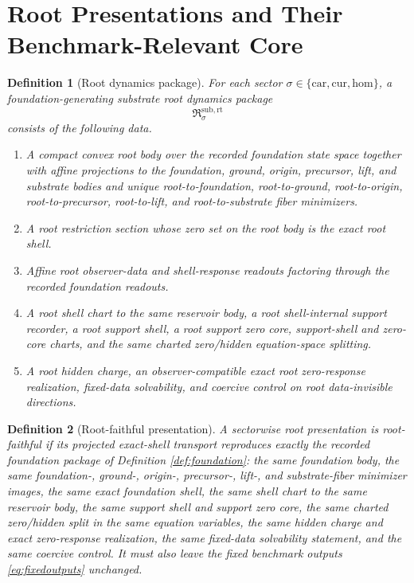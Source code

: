 \documentclass[11pt]{article}
\newcommand{\Car}{\mathrm{car}}
\newcommand{\Cur}{\mathrm{cur}}
\newcommand{\Hom}{\mathrm{hom}}
\newcommand{\RootPackage}{\mathfrak R^{\mathrm{sub,rt}}}
\newtheorem{definition}{Definition}
\begin{document}
\section{Root Presentations and Their Benchmark-Relevant Core}

\begin{definition}[Root dynamics package]
\label{def:root}
For each sector \(\sigma\in\{\Car,\Cur,\Hom\}\), a \emph{foundation-generating substrate root dynamics package}
\[
\RootPackage_{\sigma}
\]
consists of the following data.
\begin{enumerate}
    \item A compact convex root body over the recorded foundation state space together with affine projections to the foundation, ground, origin, precursor, lift, and substrate bodies and unique root-to-foundation, root-to-ground, root-to-origin, root-to-precursor, root-to-lift, and root-to-substrate fiber minimizers.
    \item A root restriction section whose zero set on the root body is the exact root shell.
    \item Affine root observer-data and shell-response readouts factoring through the recorded foundation readouts.
    \item A root shell chart to the same reservoir body, a root shell-internal support recorder, a root support shell, a root support zero core, support-shell and zero-core charts, and the same charted zero/hidden equation-space splitting.
    \item A root hidden charge, an observer-compatible exact root zero-response realization, fixed-data solvability, and coercive control on root data-invisible directions.
\end{enumerate}
\end{definition}

\begin{definition}[Root-faithful presentation]
\label{def:faithful}
A sectorwise root presentation is \emph{root-faithful} if its projected exact-shell transport reproduces exactly the recorded foundation package of Definition \ref{def:foundation}: the same foundation body, the same foundation-, ground-, origin-, precursor-, lift-, and substrate-fiber minimizer images, the same exact foundation shell, the same shell chart to the same reservoir body, the same support shell and support zero core, the same charted zero/hidden split in the same equation variables, the same hidden charge and exact zero-response realization, the same fixed-data solvability statement, and the same coercive control. It must also leave the fixed benchmark outputs \eqref{eq:fixedoutputs} unchanged.
\end{definition}
\end{document}
